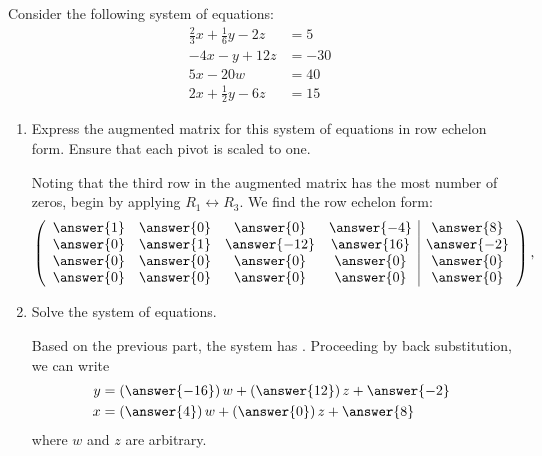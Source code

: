 \documentclass{ximera}
\author{Parisa Fatheddin}
\begin{document}
\begin{exercise} Consider the following system of equations:
\begin{align*}
\frac{2}{3}x + \frac{1}{6}y -2z &= 5\\
-4x -y+12z &= -30\\
5x-20w &= 40\\
2x+\frac{1}{2} y - 6z &= 15
\end{align*}

\begin{enumerate}
\item Express the augmented matrix for this system of equations in row
  echelon form. Ensure that each pivot is scaled to one.
\begin{prompt}
Noting that the third row in the augmented matrix has the most number
of zeros, begin by applying $R_{1}\leftrightarrow R_{3}$. We find the
row echelon form:
\[
\left(\begin{array}{cccc|c}
  \answer{1} &  \answer{0} & \answer{0} & \answer{-4} &\answer{8} \\
  \answer{0} &  \answer{1} & \answer{-12} & \answer{16} &\answer{-2}\\
  \answer{0} &  \answer{0} & \answer{0} & \answer{0} &\answer{0}\\
  \answer{0} &  \answer{0} & \answer{0} & \answer{0} &\answer{0}
\end{array}\right),
\]
\end{prompt}
\item Solve the system of equations.
  \begin{prompt}
    Based on the previous part, the system has . Proceeding
    by back substitution, we can write
    \begin{align*}
      y &= \left(\answer{-16}\right)w + \left(\answer{12}\right)z + \answer{-2}\\
      x &= \left(\answer{4}\right) w + \left(\answer{0}\right)z + \answer{8}
    \end{align*}
    where $w$ and $z$ are arbitrary.
  \end{prompt}
\end{enumerate}
\end{exercise}
\end{document}
